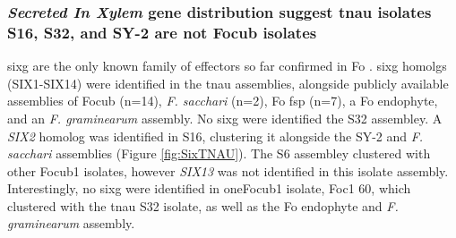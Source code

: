 \subsubsection{\textit{Secreted In Xylem} gene distribution suggest \ac{tnau} isolates S16, S32, and SY-2 are not \ac{Focub} isolates}

\Ac{sixg} are the only known family of effectors so far confirmed in \ac{Fo} \parencite{Armitage2018}. \Ac{sixg} homolgs (SIX1-SIX14) were identified in the \ac{tnau} assemblies, alongside publicly available assemblies of \ac{Focub} (n=14), \textit{F. sacchari} (n=2), \ac{Fo} \ac{fsp} (n=7), a \ac{Fo} endophyte, and an \textit{F. graminearum} assembly. No \ac{sixg} were identified the S32 assembley. A \textit{SIX2} homolog was identified in S16, clustering it alongside the SY-2 and \textit{F. sacchari} assemblies (Figure \ref{fig:SixTNAU}). The S6 assembley clustered with other \ac{Focub1} isolates, however \textit{SIX13} was not identified in this isolate assembly. Interestingly, no \ac{sixg} were identified in one\ac{Focub1} isolate, Foc1 60, which clustered with the \ac{tnau} S32 isolate, as well as the \ac{Fo} endophyte and \textit{F. graminearum} assembly. 


